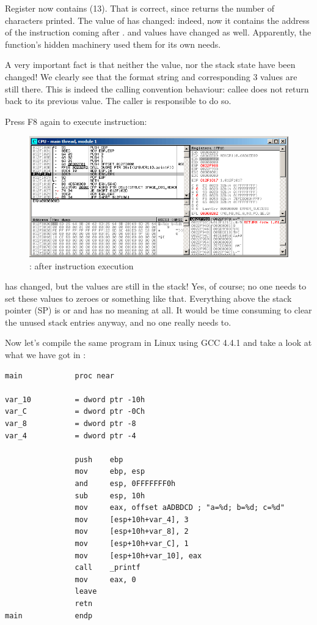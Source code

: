 Register \EAX now contains  (13).
That is correct, since \printf returns the number of characters printed. 
The value of \EIP has changed: indeed, now it contains the address of the instruction coming after 
.
\ECX and \EDX values have changed as well.
Apparently, the \printf function's hidden machinery used them for its own needs.

A very important fact is that neither the \ESP value, nor the stack state have been changed!
We clearly see that the format string and corresponding 3 values are still there.
This is indeed the  calling convention behaviour: \gls{callee} does not return \ESP back to its previous value.
The \gls{caller} is responsible to do so.

\clearpage
Press F8 again to execute  instruction:

\begin{figure}[H]
\centering
\includegraphics[scale=\FigScale]{patterns/03_printf/x86/olly3_4.png}
\caption{\olly: after  instruction execution}
\label{fig:printf3_olly_4}
\end{figure}

\ESP has changed, but the values are still in the stack!
Yes, of course; no one needs to set these values to zeroes or something like that.
Everything above the stack pointer (\ac{SP}) 
is  or \IT{\garbage{}} and has no meaning at all.
It would be time consuming to clear the unused stack entries anyway, and no one really needs to.


Now let's compile the same program in Linux using GCC 4.4.1 and take a look at what we have got in \IDA:

\begin{lstlisting}
main            proc near

var_10          = dword ptr -10h
var_C           = dword ptr -0Ch
var_8           = dword ptr -8
var_4           = dword ptr -4

                push    ebp
                mov     ebp, esp
                and     esp, 0FFFFFFF0h
                sub     esp, 10h
                mov     eax, offset aADBDCD ; "a=%d; b=%d; c=%d"
                mov     [esp+10h+var_4], 3
                mov     [esp+10h+var_8], 2
                mov     [esp+10h+var_C], 1
                mov     [esp+10h+var_10], eax
                call    _printf
                mov     eax, 0
                leave
                retn
main            endp
\end{lstlisting}

